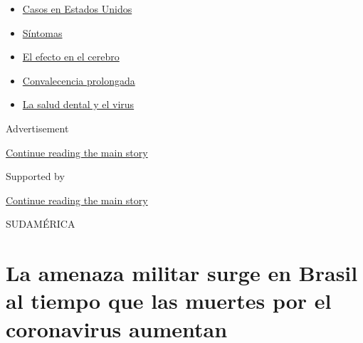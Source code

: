 \begin{itemize}
\tightlist
\item
  \href{https://www.nytimes3xbfgragh.onion/es/interactive/2020/espanol/mundo/coronavirus-en-estados-unidos.html?name=styln-coronavirus-es\&region=TOP_BANNER\&block=storyline_menu_recirc\&action=click\&pgtype=Article\&impression_id=81889670-f4bd-11ea-b05b-4ba005ac198e\&variant=undefined}{Casos
  en Estados Unidos}
\item
  \href{https://www.nytimes3xbfgragh.onion/es/interactive/2020/08/06/espanol/ciencia-y-tecnologia/tengo-covid-19-sintomas.html?name=styln-coronavirus-es\&region=TOP_BANNER\&block=storyline_menu_recirc\&action=click\&pgtype=Article\&impression_id=81889671-f4bd-11ea-b05b-4ba005ac198e\&variant=undefined}{Síntomas}
\item
  \href{https://www.nytimes3xbfgragh.onion/es/2020/09/11/espanol/ciencia-y-tecnologia/cerebro-coronavirus.html?name=styln-coronavirus-es\&region=TOP_BANNER\&block=storyline_menu_recirc\&action=click\&pgtype=Article\&impression_id=81889672-f4bd-11ea-b05b-4ba005ac198e\&variant=undefined}{El
  efecto en el cerebro}
\item
  \href{https://www.nytimes3xbfgragh.onion/es/2020/09/09/espanol/ciencia-y-tecnologia/salud-mental-coronavirus.html?name=styln-coronavirus-es\&region=TOP_BANNER\&block=storyline_menu_recirc\&action=click\&pgtype=Article\&impression_id=81889673-f4bd-11ea-b05b-4ba005ac198e\&variant=undefined}{Convalecencia
  prolongada}
\item
  \href{https://www.nytimes3xbfgragh.onion/es/2020/09/08/espanol/ciencia-y-tecnologia/dentistas-covid-dientes.html?name=styln-coronavirus-es\&region=TOP_BANNER\&block=storyline_menu_recirc\&action=click\&pgtype=Article\&impression_id=81889674-f4bd-11ea-b05b-4ba005ac198e\&variant=undefined}{La
  salud dental y el virus}
\end{itemize}

Advertisement

\protect\hyperlink{after-top}{Continue reading the main story}

Supported by

\protect\hyperlink{after-sponsor}{Continue reading the main story}

SUDAMÉRICA

\hypertarget{la-amenaza-militar-surge-en-brasil-al-tiempo-que-las-muertes-por-el-coronavirus-aumentan}{%
\section{La amenaza militar surge en Brasil al tiempo que las muertes
por el coronavirus
aumentan}\label{la-amenaza-militar-surge-en-brasil-al-tiempo-que-las-muertes-por-el-coronavirus-aumentan}}

